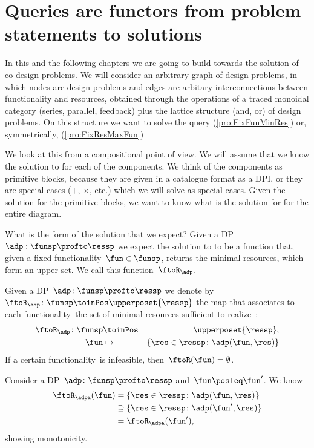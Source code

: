 \section{Queries are functors from problem statements to solutions}

In this and the following chapters we are going to build towards the solution of co-design problems.
We will consider an arbitrary graph of design problems, in which nodes are design problems and edges are arbitary interconnections between functionality and resources, obtained through the operations of a traced monoidal category (series, parallel, feedback) plus the lattice structure (and, or) of design problems. On this structure we want to solve the query \FixFunMinRes (\cref{pro:FixFunMinRes}) or, symmetrically, \FixResMaxFun (\cref{pro:FixResMaxFun})


We look at this from a compositional point of view. We will assume that we know the solution to \FixFunMinRes for each of the components. We think of the components as primitive blocks, because they are given in a catalogue format as a DPI, or they are special cases ($+$, $\times$, etc.) which we will solve as special cases.  Given the solution for the primitive blocks, we want to know what is the solution for \FixFunMinRes for the entire diagram.

What is the form of the solution that we expect? Given a DP $\adp: \funsp \profto \ressp$ we expect the solution to \FixFunMinRes to be a function that, given a fixed functionality~$\fun\in\funsp$, returns the minimal resources, which form an upper set. We call this function~$\ftoR_\adp$.

\begin{definition}
  \label{def:ftoR-dp}
  Given a DP~$\adp\colon\funsp\profto\ressp$
  we denote by~$\ftoR_{\adp}\colon \funsp\toinPos \upperposet{\ressp}$ the map that associates
  to each functionality~\fun the set of minimal resources sufficient to realize~\fun:
  \begin{eqnarray*}
    \ftoR_{\adp}\colon \funsp & \toinPos & \upperposet{\ressp},\\
    \fun& \mapsto & \{ \res \in \ressp \colon \adp(\fun, \res)\}
  \end{eqnarray*}
  If a certain functionality~\fun is infeasible, then~$\ftoR(\fun)=\emptyset$.
\end{definition}

\begin{remark}[Monotonicity]
    Consider a DP~$\adp\colon\funsp\profto\ressp$ and~$\fun\posleq \fun'$. We know
    \begin{equation*}
        \begin{aligned}
            \ftoR_\adpa(\fun)&=\{ \res \in \ressp \colon \adp(\fun, \res)\} \\
            &\supseteq \{ \res \in \ressp \colon \adp(\fun', \res)\}\\
            &=\ftoR_\adpa(\fun'),
        \end{aligned}
    \end{equation*}
    showing monotonicity.
\end{remark}



